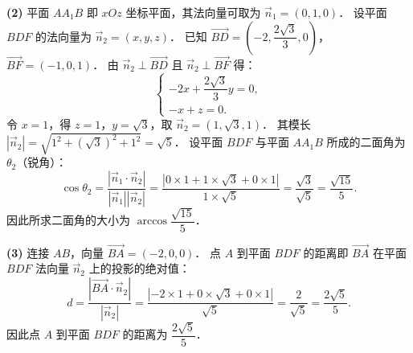 \begin{answer}
\textbf{(2)}
平面 $AA_1B$ 即 $xOz$ 坐标平面，其法向量可取为 $\vec{n}_1 = (0, 1, 0)$．
设平面 $BDF$ 的法向量为 $\vec{n}_2 = (x, y, z)$．
已知 $\vec{BD} = \left(-2, \dfrac{2\sqrt{3}}{3}, 0\right)$，$\vec{BF} = (-1, 0, 1)$．
由 $\vec{n}_2 \perp \vec{BD}$ 且 $\vec{n}_2 \perp \vec{BF}$ 得：
\nopagebreak[4]
\[
\begin{cases} -2x + \dfrac{2\sqrt{3}}{3}y = 0, \\ -x + z = 0. \end{cases}
\]
令 $x = 1$，得 $z = 1$，$y = \sqrt{3}$，取 $\vec{n}_2 = (1, \sqrt{3}, 1)$．
其模长 $|\vec{n}_2| = \sqrt{1^2 + (\sqrt{3})^2 + 1^2} = \sqrt{5}$．
设平面 $BDF$ 与平面 $AA_1B$ 所成的二面角为 $\theta_2$（锐角）：
\nopagebreak[4]
\[
\cos\theta_2 = \dfrac{|\vec{n}_1 \cdot \vec{n}_2|}{|\vec{n}_1||\vec{n}_2|} = \dfrac{|0 \times 1 + 1 \times \sqrt{3} + 0 \times 1|}{1 \times \sqrt{5}} = \dfrac{\sqrt{3}}{\sqrt{5}} = \dfrac{\sqrt{15}}{5}.
\]
因此所求二面角的大小为 $\arccos\dfrac{\sqrt{15}}{5}$．

\textbf{(3)}
连接 $AB$，向量 $\vec{BA} = (-2, 0, 0)$．
点 $A$ 到平面 $BDF$ 的距离即 $\vec{BA}$ 在平面 $BDF$ 法向量 $\vec{n}_2$ 上的投影的绝对值：
\nopagebreak[4]
\[
d = \dfrac{|\vec{BA} \cdot \vec{n}_2|}{|\vec{n}_2|} = \dfrac{|-2 \times 1 + 0 \times \sqrt{3} + 0 \times 1|}{\sqrt{5}} = \dfrac{2}{\sqrt{5}} = \dfrac{2\sqrt{5}}{5}.
\]
因此点 $A$ 到平面 $BDF$ 的距离为 $\dfrac{2\sqrt{5}}{5}$．




\end{answer}
